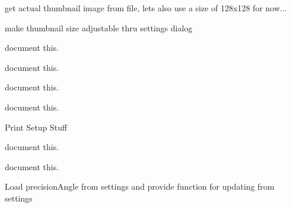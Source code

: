 \begin{DoxyRefList}
\label{todo__todo000022}%
%
get actual thumbnail image from file, lets also use a size of 128x128 for now...

\label{todo__todo000023}%
%
make thumbnail size adjustable thru settings dialog 
\item[Member \mbox{\hyperlink{imgui__main_8c_a2215c9aae4a42877f53d58d5072dcc65}{preview\+\_\+off}} (void)]\label{todo__todo000038}%
%
document this.  
\item[Member \mbox{\hyperlink{imgui__main_8c_ac98567c915ff93cc4042dc100366bfc1}{preview\+\_\+on\+\_\+action}} (void)]\label{todo__todo000129}%
%
document this.  
\item[Member \mbox{\hyperlink{imgui__main_8c_ac09c52d8c04451a1763efb240514db61}{print\+\_\+action}} (void)]\label{todo__todo000115}%
%
document this.  
\item[Member \mbox{\hyperlink{imgui__main_8c_a5c67ae25520041868d38ec8c49589553}{print\+\_\+area\+\_\+action}} (void)]\label{todo__todo000125}%
%
document this.  
\item[Member \mbox{\hyperlink{imgui__main_8c_a7f83a6bf28f21699753530d3a659a0bd}{Print\+Area}} (Emb\+Real x, Emb\+Real y, Emb\+Real w, Emb\+Real h)]\label{todo__todo000185}%
%
Print Setup Stuff  
\item[Member \mbox{\hyperlink{imgui__main_8c_adcadf5f247e819122ddc4edba08540c1}{prompt\+Input\+Next}} (void)]\label{todo__todo000178}%
%
document this.  
\item[Member \mbox{\hyperlink{imgui__main_8c_a04881913e0d4bcc19bddf5b53036c24e}{prompt\+Input\+Previous}} (void)]\label{todo__todo000177}%
%
document this.  
\item[Member \mbox{\hyperlink{imgui__main_8c_a6fec08ec06d2be895e3c320f3648b398}{property\+\_\+editor}} (void)]\label{todo__todo000069}%
%
Load precision\+Angle from settings and provide function for updating from settings 




\end{DoxyRefList}
